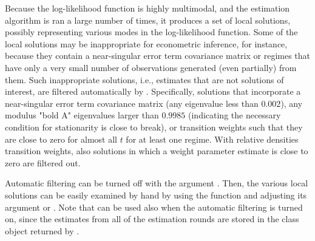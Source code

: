 \documentclass[nojss]{jss}
\begin{document}
Because the log-likelihood function is highly multimodal, and the estimation algorithm is ran a large number of times, it produces a set of local solutions, possibly representing various modes in the log-likelihood function. Some of the local solutions may be inappropriate for econometric inference, for instance, because they contain a near-singular error term covariance matrix or regimes that have only a very small number of observations generated (even partially) from them. Such inappropriate solutions, i.e., estimates that are not solutions of interest, are filtered automatically by . Specifically, solutions that incorporate a near-singular error term covariance matrix (any eigenvalue less than $0.002$), any modulus "bold A" eigenvalues larger than $0.9985$ (indicating the necessary condition for stationarity is close to break), or transition weights such that they are close to zero for almost all $t$ for at least one regime. With relative densities transition weights, also solutions in which a weight parameter estimate is close to zero are filtered out.

Automatic filtering can be turned off with the argument . Then, the various local solutions can be easily examined by hand by using the function  and adjusting its argument  or . Note that  can be used also when the automatic filtering is turned on, since the estimates from all of the estimation rounds are stored in the class  object returned by .
\end{document}
